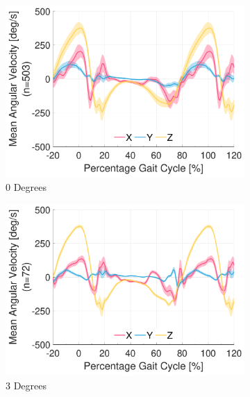 \begin{figure}[!p]
    \centering
    \begin{subfigure}[b]{0.3\textwidth}
        \includegraphics[width=\textwidth]{content/3-Methods/ramp/ch3_ramp_0_degree_activity_walking_gyro_r_ankle.pdf}
        \caption{0 Degrees}
    \end{subfigure}
    \begin{subfigure}[b]{0.3\textwidth}
        \includegraphics[width=\textwidth]{content/3-Methods/ramp/ch3_ramp_3_degree_activity_ramp_up_gyro_r_ankle.pdf}
        \caption{3 Degrees}
    \end{subfigure}
    \begin{subfigure}[b]{0.3\textwidth}

\end{subfigure}
\end{figure}
